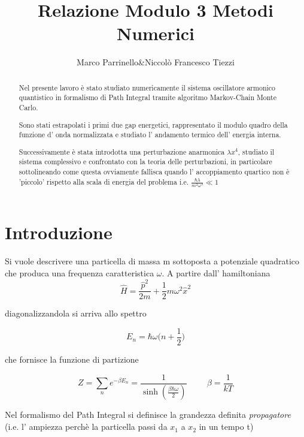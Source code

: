 \documentclass{article}
\title{Relazione Modulo 3 Metodi Numerici}
\author{Marco Parrinello&Niccolò Francesco Tiezzi}
\date{}
\begin{document}
\maketitle
\begin{abstract}
Nel presente lavoro è stato studiato numericamente il sistema oscillatore armonico quantistico in formalismo di Path Integral tramite algoritmo Markov-Chain Monte Carlo. 

Sono stati estrapolati i primi due gap energetici, rappresentato il modulo quadro della funzione d' onda normalizzata e studiato l' andamento termico dell' energia interna.

Successivamente è stata introdotta una perturbazione anarmonica $\lambda x^4$, studiato il sistema complessivo e confrontato con la teoria delle perturbazioni, in particolare sottolineando come questa ovviamente fallisca quando l' accoppiamento quartico non è 'piccolo' rispetto alla scala di energia del problema i.e. $\displaystyle \frac{\hbar \lambda}{m^2\omega^3} \ll 1$
\end{abstract}
\maketitle

\section{Introduzione}

Si vuole descrivere una particella di massa m sottoposta a potenziale quadratico che produca una frequenza caratteristica $\omega$. A partire dall' hamiltoniana
\begin{equation}
\hat{H} = \frac{\hat{p}^2}{2m} + \frac{1}{2}m\omega^2\hat{x}^2
\end{equation}

diagonalizzandola si arriva allo spettro

\begin{equation}
\displaystyle E_n = \hbar\omega\Big(n+\frac{1}{2}\Big) 
\end{equation}

che fornisce la funzione di partizione 

\begin{equation}
Z = \displaystyle \sum_n e^{-\beta E_n} = \frac{1}{\sinh(\frac{\beta\hbar\omega}{2})} \hspace{1cm} \beta = \frac{1}{kT}
\end{equation}

Nel formalismo del Path Integral si definisce la grandezza definita \textit{propagatore} (i.e. l' ampiezza perchè la particella passi da $x_1$ a $x_2$ in un tempo t)
\end{document}
